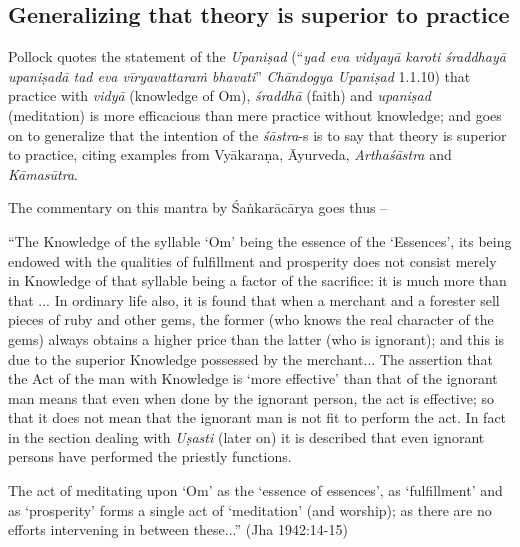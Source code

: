 \subsection{Generalizing that theory is superior to practice}\label{art12-sec3.5}

Pollock quotes the statement of the {\sl Upaniṣad} (``{\sl yad eva vidyayā karoti śraddhayā upaniṣadā tad eva vīryavattaraṁ bhavati}'' {\sl Chāndogya Upaniṣad} 1.1.10) that practice with {\sl vidyā} (knowledge of Om), {\sl śraddhā} (faith) and {\sl upaniṣad} (meditation) is more efficacious than mere practice without knowledge; and goes on to generalize that the intention of the \hbox{{\sl śāstra}-s} is to say that theory is superior to practice, citing examples from Vyākaraṇa, Āyurveda, {\sl Arthaśāstra} and {\sl Kāmasūtra}.

The commentary on this mantra by Śaṅkarācārya goes thus --

\begin{myquote}
``The Knowledge of the syllable `Om' being the essence of the `Essences', its being endowed with the qualities of fulﬁllment and prosperity does not consist merely in Knowledge of that syllable being a factor of the sacriﬁce: it is much more than that ... In ordinary life also, it is found that when a merchant and a forester sell pieces of ruby and other gems, the former (who knows the real character of the gems) always obtains a higher price than the	latter (who is ignorant); and this is due to the superior Knowledge possessed by the merchant... The assertion that the Act of the man with Knowledge is `more effective' than that of the ignorant man means that even when done by the ignorant person, the act is effective; so that it does not mean that the ignorant man is not ﬁt to perform the act. In fact in the section dealing with {\sl Uṣasti} (later on) it is described that even ignorant persons have performed the priestly functions.

The act of meditating upon `Om' as the `essence of essences', as `fulfillment' and as `prosperity' forms a single act of `meditation' (and worship); as there are no efforts intervening in between these...'' (Jha 1942:14-15)
\end{myquote}

